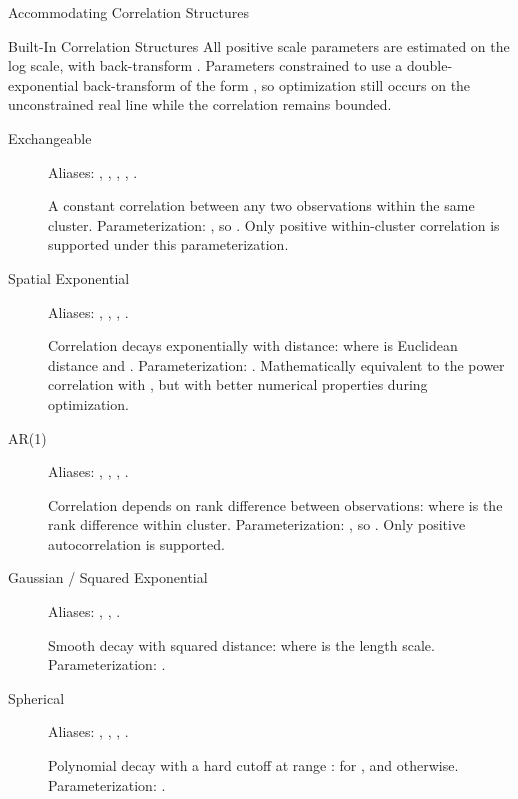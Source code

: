 \begin{Section}{Accommodating Correlation Structures}
\begin{SubSection}{Built-In Correlation Structures}
All positive scale parameters are estimated on the log scale,
with back-transform \eqn{\exp(\cdot)}{}. Parameters constrained to
 use a double-exponential back-transform of the form
\eqn{\exp(-\exp(\eta))}{}, so optimization still occurs on the
unconstrained real line while the correlation remains bounded.

\begin{description}

\item[Exchangeable] 
Aliases: , , ,
, .

A constant correlation \eqn{\nu}{} between any two observations within
the same cluster. Parameterization: \eqn{\nu = \exp(-\exp(\rho))}{},
so . Only positive within-cluster correlation is
supported under this parameterization.

\item[Spatial Exponential] 
Aliases: , ,
, .

Correlation decays exponentially with distance:
 where  is Euclidean distance and
. Parameterization: \eqn{\omega = \exp(\rho)}{}.
Mathematically equivalent to the power correlation 
with , but with better numerical properties
during optimization.

\item[AR(1)] 
Aliases: , , , .

Correlation depends on rank difference between observations:
 where  is the rank difference within cluster.
Parameterization: \eqn{\nu = \exp(-\exp(\rho))}{},
so . Only positive autocorrelation is supported.

\item[Gaussian / Squared Exponential] 
Aliases: , , .

Smooth decay with squared distance:
 where \eqn{\ell}{} is the length scale.
Parameterization: \eqn{\ell = \exp(\rho)}{}.

\item[Spherical] 
Aliases: , , ,
.

Polynomial decay with a hard cutoff at range :
 for , and 
otherwise. Parameterization: .


\end{description}
\end{SubSection}
\end{Section}
